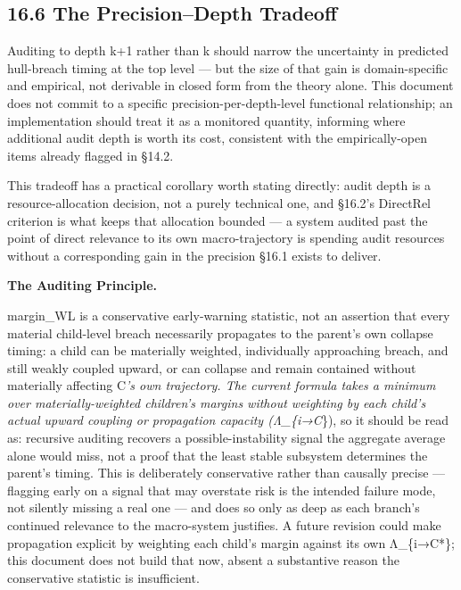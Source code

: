 \documentclass[
]{article}
\begin{document}
\hypertarget{the-precisiondepth-tradeoff}{%
\subsection{16.6 The Precision--Depth
Tradeoff}\label{the-precisiondepth-tradeoff}}

Auditing to depth k+1 rather than k should narrow the uncertainty in
predicted hull-breach timing at the top level --- but the size of that
gain is domain-specific and empirical, not derivable in closed form from
the theory alone. This document does not commit to a specific
precision-per-depth-level functional relationship; an implementation
should treat it as a monitored quantity, informing where additional
audit depth is worth its cost, consistent with the empirically-open
items already flagged in §14.2.

This tradeoff has a practical corollary worth stating directly: audit
depth is a resource-allocation decision, not a purely technical one, and
§16.2's DirectRel criterion is what keeps that allocation bounded --- a
system audited past the point of direct relevance to its own
macro-trajectory is spending audit resources without a corresponding
gain in the precision §16.1 exists to deliver.

\textbf{The Auditing Principle.}

margin\_WL is a conservative early-warning statistic, not an assertion
that every material child-level breach necessarily propagates to the
parent's own collapse timing: a child can be materially weighted,
individually approaching breach, and still weakly coupled upward, or can
collapse and remain contained without materially affecting C\emph{'s own
trajectory. The current formula takes a minimum over materially-weighted
children's margins without weighting by each child's actual upward
coupling or propagation capacity (Λ\_\{i→C}\}), so it should be read as:
recursive auditing recovers a possible-instability signal the aggregate
average alone would miss, not a proof that the least stable subsystem
determines the parent's timing. This is deliberately conservative rather
than causally precise --- flagging early on a signal that may overstate
risk is the intended failure mode, not silently missing a real one ---
and does so only as deep as each branch's continued relevance to the
macro-system justifies. A future revision could make propagation
explicit by weighting each child's margin against its own Λ\_\{i→C*\};
this document does not build that now, absent a substantive reason the
conservative statistic is insufficient.
\end{document}
